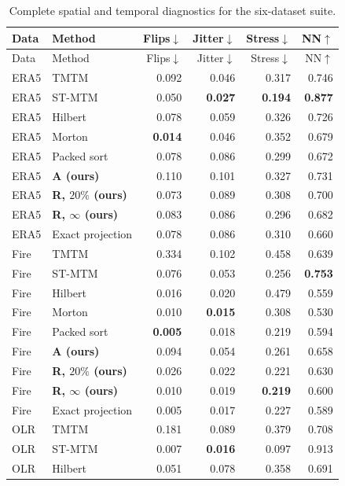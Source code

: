 \begingroup\small\setlength{\tabcolsep}{4pt}
\begin{longtable}{llrrrr}
\caption{Complete spatial and temporal diagnostics for the six-dataset suite.}\label{tab:hidden_quality_supp}\\\toprule
Data & Method & Flips$\downarrow$ & Jitter$\downarrow$ & Stress$\downarrow$ & NN$\uparrow$\\\midrule\endfirsthead
\toprule Data & Method & Flips$\downarrow$ & Jitter$\downarrow$ & Stress$\downarrow$ & NN$\uparrow$\\\midrule\endhead
\bottomrule\endfoot
ERA5 & TMTM & 0.092 & 0.046 & 0.317 & 0.746\\
ERA5 & ST-MTM & 0.050 & \textbf{0.027} & \textbf{0.194} & \textbf{0.877}\\
ERA5 & Hilbert & 0.078 & 0.059 & 0.326 & 0.726\\
ERA5 & Morton & \textbf{0.014} & 0.046 & 0.352 & 0.679\\
ERA5 & Packed sort & 0.078 & 0.086 & 0.299 & 0.672\\
ERA5 & \textbf{A (ours)} & 0.110 & 0.101 & 0.327 & 0.731\\
ERA5 & \textbf{R, $20\%$ (ours)} & 0.073 & 0.089 & 0.308 & 0.700\\
ERA5 & \textbf{R, $\infty$ (ours)} & 0.083 & 0.086 & 0.296 & 0.682\\
ERA5 & Exact projection & 0.078 & 0.086 & 0.310 & 0.660\\
Fire & TMTM & 0.334 & 0.102 & 0.458 & 0.639\\
Fire & ST-MTM & 0.076 & 0.053 & 0.256 & \textbf{0.753}\\
Fire & Hilbert & 0.016 & 0.020 & 0.479 & 0.559\\
Fire & Morton & 0.010 & \textbf{0.015} & 0.308 & 0.530\\
Fire & Packed sort & \textbf{0.005} & 0.018 & 0.219 & 0.594\\
Fire & \textbf{A (ours)} & 0.094 & 0.054 & 0.261 & 0.658\\
Fire & \textbf{R, $20\%$ (ours)} & 0.026 & 0.022 & 0.221 & 0.630\\
Fire & \textbf{R, $\infty$ (ours)} & 0.010 & 0.019 & \textbf{0.219} & 0.600\\
Fire & Exact projection & 0.005 & 0.017 & 0.227 & 0.589\\
OLR & TMTM & 0.181 & 0.089 & 0.379 & 0.708\\
OLR & ST-MTM & 0.007 & \textbf{0.016} & 0.097 & 0.913\\
OLR & Hilbert & 0.051 & 0.078 & 0.358 & 0.691\\

\end{longtable}

